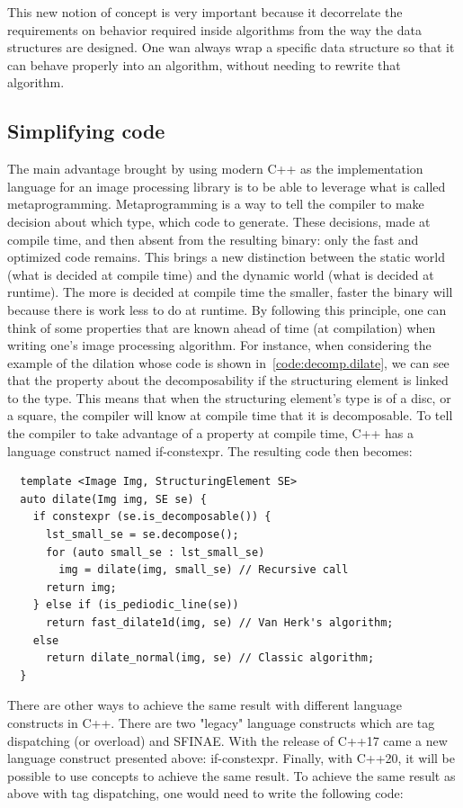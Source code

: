 This new notion of concept is very important because it decorrelate the requirements on behavior required inside
algorithms from the way the data structures are designed. One wan always wrap a specific data structure so that it can
behave properly into an algorithm, without needing to rewrite that algorithm.

\subsection{Simplifying code}
\label{subsec:simplifying}

The main advantage brought by using modern C++ as the implementation language for an image processing library is to be
able to leverage what is called metaprogramming. Metaprogramming is a way to tell the compiler to make decision about
which type, which code to generate. These decisions, made at compile time, and then absent from the resulting binary:
only the fast and optimized code remains. This brings a new distinction between the static world (what is decided at
compile time) and the dynamic world (what is decided at runtime). The more is decided at compile time the smaller,
faster the binary will because there is work less to do at runtime. By following this principle, one can think of some
properties that are known ahead of time (at compilation) when writing one's image processing algorithm. For instance,
when considering the example of the dilation whose code is shown in~\ref{code:decomp.dilate}, we can see that the
property about the decomposability if the structuring element is linked to the type. This means that when the
structuring element's type is of a disc, or a square, the compiler will know at compile time that it is decomposable. To
tell the compiler to take advantage of a property at compile time, C++ has a language construct named if-constexpr. The
resulting code then becomes:

\begin{verbatim}
  template <Image Img, StructuringElement SE>
  auto dilate(Img img, SE se) {
    if constexpr (se.is_decomposable()) {
      lst_small_se = se.decompose();
      for (auto small_se : lst_small_se)
        img = dilate(img, small_se) // Recursive call
      return img;
    } else if (is_pediodic_line(se))
      return fast_dilate1d(img, se) // Van Herk's algorithm;
    else
      return dilate_normal(img, se) // Classic algorithm;
  }
\end{verbatim}

There are other ways to achieve the same result with different language constructs in C++. There are two "legacy"
language constructs which are tag dispatching (or overload) and SFINAE. With the release of C++17 came a new language
construct presented above: if-constexpr. Finally, with C++20, it will be possible to use concepts to achieve the same
result. To achieve the same result as above with tag dispatching, one would need to write the following code:

